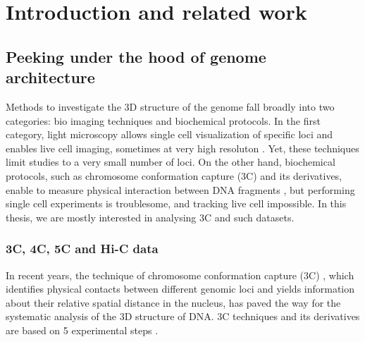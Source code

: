 

\chapter{Introduction and related work}

\graphicspath{{1_introduction/}}

\begin{abstract}{Résumé}

\end{abstract}

\begin{abstract}{Abstract}

We aim in this chapter at providing some background on biological and
mathematical concepts present in this thesis.

\end{abstract}


\section{Peeking under the hood of genome architecture}

Methods to investigate the 3D structure of the genome fall broadly into two
categories: bio imaging techniques and biochemical protocols. In the first
category, light microscopy allows single cell visualization of specific loci
and enables live cell imaging, sometimes at very high resoluton
\citep{cremer:chromosome-2010}. Yet, these techniques limit studies to a very
small number of loci. On the other hand, biochemical protocols, such as
chromosome conformation capture (3C) and its derivatives, enable to measure
physical interaction between DNA fragments \cite{dekker:capturing}, but
performing single cell experiments is troublesome, and tracking live cell
impossible. In this thesis, we are mostly interested in analysing 3C and such
datasets.

\subsection{3C, 4C, 5C and Hi-C data}

 In recent years, the technique of chromosome conformation capture (3C)
\citep{dekker:capturing}, which identifies physical contacts between different
genomic loci and yields information about their relative spatial distance in
the nucleus, has paved the way for the systematic analysis of the 3D structure
of DNA. 3C techniques and its derivatives are based on 5 experimental steps
\citep{lieberman-aiden:comprehensive, kalhor:genome}.

